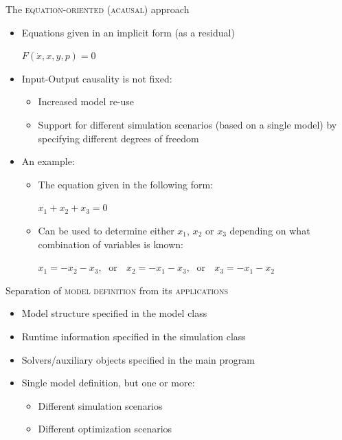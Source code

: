 \documentclass[compress,newPxFont,sthlmFooter]{beamer}
\begin{document}
\begin{frame}{The \textsc{equation-oriented} (\textsc{acausal}) approach}
\begin{itemize}
  \item \alert{Equations given in an implicit form} (as a residual)
    \begin{center}
      $F(\dot {x}, x, y, p) = 0$
    \end{center}
  \item \alert{Input-Output causality} is \alert{not fixed}:
    \begin{itemize}
        \item Increased model re-use
        \item Support for \alert{different simulation scenarios} (based on a single model) by specifying different degrees of freedom
    \end{itemize}
  \item An example:
    \begin{itemize}
        \item The equation given in the following form:
            \begin{center}
                $x_1 + x_2 + x_3 = 0$
            \end{center}
        \item Can be used to determine either $x_1$, $x_2$ or $x_3$ depending on what combination of variables is known:
            \begin{center}
                $x_1 = -x_2 - x_3, \;$ \alert{or}  $\;$
                $x_2 = -x_1 - x_3, \;$ \alert{or}  $\;$
                $x_3 = -x_1 - x_2$
            \end{center}
    \end{itemize}
\end{itemize}
\end{frame}

\begin{frame}{Separation of \textsc{model definition} from its \textsc{applications}}
\begin{itemize}
  \item \alert{Model structure} specified in the \alert{model class}
  \item \alert{Runtime information} specified in the \alert{simulation class}
  \item \alert{Solvers/auxiliary objects} specified in the \alert{main program}
  \item \alert{Single model definition}, but \alert{one or more}:
  \begin{itemize}
    \item Different \alert{simulation scenarios}
    \item Different \alert{optimization scenarios}
  \end{itemize}
\end{itemize}
\end{frame}
\end{document}
